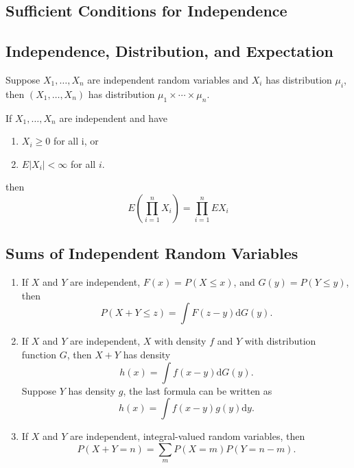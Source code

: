 \subsection{Sufficient Conditions for Independence}

\subsection{Independence, Distribution, and Expectation}

\begin{theorem}
	Suppose $X_{1},\ldots,X_{n}$ are independent random variables and $X_{i}$ has distribution $\mu_{i}$, then $\left(X_{1},\ldots,X_{n}\right)$ has distribution $\mu_{1}\times\cdots\times\mu_{n}$.
\end{theorem}

\begin{theorem}
	If $X_{1},\ldots,X_{n}$ are independent and have
	\begin{enumerate}
		\item $X_{i} \geq 0$ for all i, or
		\item $E\left|X_{i}\right|<\infty$ for all $i$.
	\end{enumerate}
	then
	\begin{equation}
		E\left(\prod_{i=1}^{n}X_{i}\right)=\prod_{i=1}^{n}EX_{i}
	\end{equation}
\end{theorem}

\subsection{Sums of Independent Random Variables}

\begin{theorem}
	\begin{enumerate}
		\item If $X$ and $Y$ are independent, $F(x)=P(X\leq x)$, and $G(y)=P(Y\leq y)$, then
		      \begin{equation}
			      P(X+Y\leq z)=\int F(z-y)\mathrm{d}G(y).
		      \end{equation}
		\item If $X$ and $Y$ are independent,  $X$ with density $f$ and $Y$ with distribution function $G$, then $X+Y$ has density
		      \begin{equation}
			      h(x)=\int f(x-y)\mathrm{d}G(y).
		      \end{equation}
		      Suppose $Y$ has density $g$, the last formula can be written as
		      \begin{equation}
			      h(x)=\int f(x-y)g(y)\mathrm{d}y.
		      \end{equation}
		\item If $X$ and $Y$ are independent, integral-valued random variables, then
		      \begin{equation}
			      P(X+Y=n)=\sum_{m}P(X=m)P(Y=n-m).
		      \end{equation}
	\end{enumerate}
\end{theorem}

